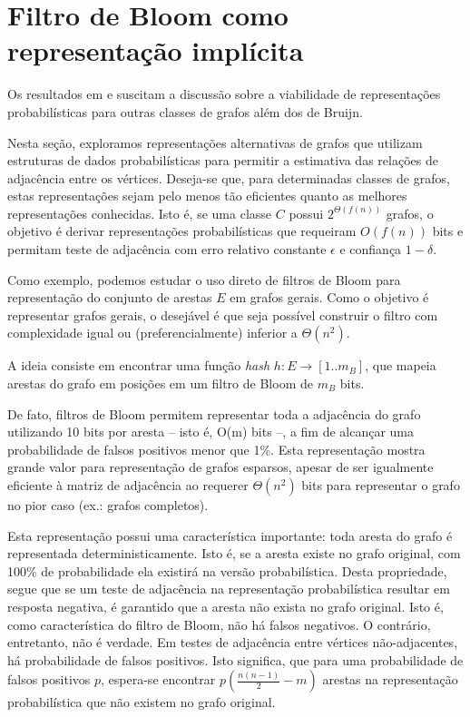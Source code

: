 
\section{Filtro de Bloom como representação implícita}\label{sec:graphs:repres}

Os resultados em \cite{pell2012scaling} e \cite{zhang2014these} suscitam a discussão sobre a viabilidade de representações probabilísticas para outras classes de grafos além dos de Bruijn.

Nesta seção, exploramos representações alternativas de grafos que utilizam estruturas de dados probabilísticas para permitir a estimativa das relações de adjacência entre os vértices. Deseja-se que, para determinadas classes de grafos, estas representações sejam pelo menos tão eficientes quanto as melhores representações conhecidas. Isto é, se uma classe $C$ possui $2^{\Theta(f(n))}$ grafos, o objetivo é derivar representações probabilísticas que requeiram $O(f(n))$ bits e permitam teste de adjacência com erro relativo constante $\epsilon$ e confiança $1 - \delta$.

Como exemplo, podemos estudar o uso direto de filtros de Bloom para representação do conjunto de arestas $E$ em grafos gerais. Como o objetivo é representar grafos gerais, o desejável é que seja possível construir o filtro com complexidade igual ou (preferencialmente) inferior a $\Theta(n^2)$. 

A ideia consiste em encontrar uma função \emph{hash} $h: E \to [1..m_B]$, que mapeia arestas do grafo em posições em um filtro de Bloom de $m_B$ bits.

De fato, filtros de Bloom permitem representar toda a adjacência do grafo utilizando 10 bits por aresta -- isto é, O(m) bits --, a fim de alcançar uma probabilidade de falsos positivos menor que 1\%. Esta representação mostra grande valor para representação de grafos esparsos, apesar de ser igualmente eficiente à matriz de adjacência ao requerer $\Theta(n^2)$ bits para representar o grafo no pior caso (ex.: grafos completos).

Esta representação possui uma característica importante: toda aresta do grafo é representada deterministicamente. Isto é, se a aresta existe no grafo original, com 100\% de probabilidade ela existirá na versão probabilística. Desta propriedade, segue que se um teste de adjacência na representação probabilística resultar em resposta negativa, é garantido que a aresta não exista no grafo original. Isto é, como característica do filtro de Bloom, não há falsos negativos. O contrário, entretanto, não é verdade. Em testes de adjacência entre vértices não-adjacentes, há probabilidade de falsos positivos. Isto significa, que para uma probabilidade de falsos positivos $p$, espera-se encontrar $p(\frac{n(n-1)}{2}-m)$ arestas na representação probabilística que não existem no grafo original.

